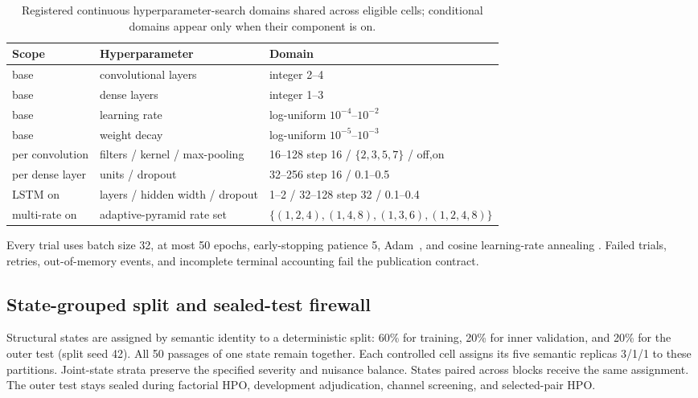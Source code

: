 \begin{table}[htbp]
\centering
\caption{Registered continuous hyperparameter-search domains shared across
eligible cells; conditional domains appear only when their component is on.}
\label{tab:search_space}
\small
\begin{tabular}{lll}
\toprule
Scope & Hyperparameter & Domain \\
\midrule
base & convolutional layers & integer 2--4 \\
base & dense layers & integer 1--3 \\
base & learning rate & log-uniform $10^{-4}$--$10^{-2}$ \\
base & weight decay & log-uniform $10^{-5}$--$10^{-3}$ \\
per convolution & filters / kernel / max-pooling & 16--128 step 16 / $\{2,3,5,7\}$ / off,on \\
per dense layer & units / dropout & 32--256 step 16 / 0.1--0.5 \\
LSTM on & layers / hidden width / dropout & 1--2 / 32--128 step 32 / 0.1--0.4 \\
multi-rate on & adaptive-pyramid rate set & $\{(1,2,4),(1,4,8),(1,3,6),(1,2,4,8)\}$ \\
\bottomrule
\end{tabular}
\end{table}

Every trial uses batch size 32, at most 50 epochs, early-stopping patience 5,
Adam~\cite{kingma2015adam}, and cosine learning-rate annealing
\cite{loshchilov2017sgdr}. Failed trials, retries, out-of-memory events, and
incomplete terminal accounting fail the publication contract.

\subsection{State-grouped split and sealed-test firewall}
\label{sec:split}

Structural states are assigned by semantic identity to a deterministic split:
60\% for training, 20\% for inner validation, and 20\% for the outer test
(split seed 42). All 50 passages of one state remain together. Each controlled
cell assigns its five semantic replicas 3/1/1 to these partitions. Joint-state
strata preserve the specified severity and nuisance balance. States paired
across blocks receive the same assignment. The outer test stays sealed during
factorial HPO, development adjudication, channel screening, and selected-pair
HPO.


